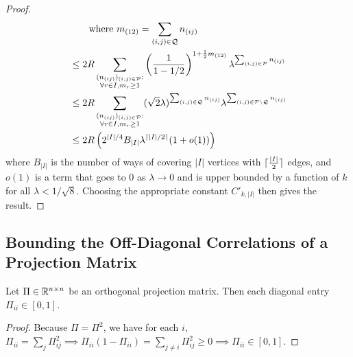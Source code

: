 \documentclass[main.tex]{subfiles}
\begin{document}
\begin{proof}
\begin{align*}
    &\qquad {\text{where $m_{(12)} = \sum_{(i,j) \in \mathcal Q} n_{(ij)}$}}
        \\
    &\le
        2R
        \sum_{\substack{(n_{(ij)})_{(i,j) \in \mathcal P}:\\\forall r \in I, m_r \ge 1}}
        \left( \frac{1}{1 - 1/2} \right)^{1 + \frac{1}{2} m_{(12)}}
         \lambda^{\sum_{(i,j) \in \mathcal P} n_{(ij)}}
        \\
    &\le
        2R
        \sum_{\substack{(n_{(ij)})_{(i,j) \in \mathcal P}:\\\forall r \in I, m_r \ge 1}}
         (\sqrt 2 \lambda)^{\sum_{(i,j) \in \mathcal Q} n_{(ij)}}
         \lambda^{\sum_{(i,j)\in \mathcal P \setminus \mathcal Q} n_{(ij)}}
        \\
    &\le
        2R
        \left( 2^{|I|/4} B_{|I|} \lambda^{\lceil |I|/2\rceil} (1 + o(1)) \right)
\end{align*}
where $B_{|I|}$ is the number of ways of covering $|I|$ vertices with $\lceil \frac{|I|}{2} \rceil$ edges, and
$o(1)$ is a term that goes to 0 as $\lambda \to 0$ and is upper bounded by a function of $k$ for all $\lambda < 1/\sqrt 8$.
Choosing the appropriate constant $C'_{k, |I|}$ then gives the result.
\end{proof}

\subsection{Bounding the Off-Diagonal Correlations of a Projection Matrix}

\begin{lemma}\label{lemma:projectionDiagonal}
Let $\Pi \in \mathbb{R}^{n \times n}$ be an orthogonal projection matrix.
Then each diagonal entry $\Pi_{ii} \in [0, 1].$
\end{lemma}
\begin{proof}
Because $\Pi = \Pi^2$, we have for each $i$, $\Pi_{ii} = \sum_{j} \Pi_{ij}^2 \implies \Pi_{ii} (1 - \Pi_{ii}) = \sum_{j \ne i} \Pi_{ij}^2 \ge 0 \implies \Pi_{ii} \in [0, 1].$
\end{proof}
\end{document}
